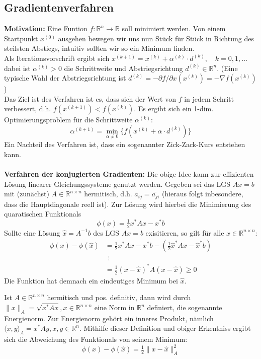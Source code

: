 \documentclass{article}
\begin{document}
\subsection{Gradientenverfahren}
\textbf{Motivation:} Eine Funtion $f:\mathbb{R}^n\rightarrow \mathbb{R}$ soll minimiert werden. 
Von einem Startpunkt $x^{(0)}$ ausgehen bewegen wir uns nun Stück für Stück in Richtung des steilsten Abstiegs, intuitiv sollten wir so ein Minimum finden. \\
Als Iterationsvorschrift ergibt sich $x^{(k+1)} = x^{(k)}+\alpha^{(k)}\cdot d^{(k)}, \quad k=0,1,\dotsc$\\
dabei ist $\alpha^{(k)}>0$ die Schrittweite und Abstriegsrichtung $d^{(k)}\in\mathbb{R}^n$.
(Eine typische Wahl der Abstriegsrichtung ist $d^{(k)}=-\partial f/\partial x (x^{(k)})=-\nabla f(x^{(k)})$) \\
Das Ziel ist des Verfahren ist es, dass sich der Wert von $f$ in jedem Schritt verbessert, d.h. $f(x^{(k+1)})<f(x^{(k)})$. 
Es ergibt sich ein 1-dim. Optimierungsproblem für die Schrittweite $\alpha^{(k)}$:
\[\alpha^{(k+1)}=\min_{\alpha\neq 0}\{f(x^{(k)}+\alpha\cdot d^{(k)})\}\]
Ein Nachteil des Verfahren ist, dass ein sogenannter \glqq Zick-Zack-Kurs\grqq{} entstehen kann. \\ \\
\textbf{Verfahren der konjugierten Gradienten:} Die obige Idee kann zur effizienten Lösung linearer Gleichungssysteme genutzt werden.
Gegeben sei das LGS $Ax=b$ mit (zunächst) $A\in\mathbb{R}^{n\times n}$ hermitisch, d.h. $a_{ij}=\overline{a_{ji}}$ (hieraus folgt inbesondere, dass die Hauptdiagonale reell ist). 
Zur Lösung wird hierbei die Minimierung des quaratischen Funktionals 
\[\phi(x)=\tfrac{1}{2}x^* Ax - x^*b\]
Sollte eine Lösung $\hat{x}=A^{-1}b$ des LGS $Ax=b$ exisitieren, so gilt für alle $x\in\mathbb{R}^{n\times n}$:
\begin{align*}
    \phi(x)-\phi(\hat{x}) &= \tfrac{1}{2}x^* Ax - x^*b - (\tfrac{1}{2}\hat{x}^* A\hat{x} - \hat{x}^*b) \\
    &\ \ \vdots \\
    &= \tfrac{1}{2} (x-\hat{x})^*A(x-\hat{x}) \geq 0
\end{align*}
Die Funktion hat demnach ein eindeutiges Minimum bei $\hat{x}$.
\begin{defbox}
    Ist $A\in\mathbb{R}^{n\times n}$ hermitisch und pos. definitiv, dann wird durch $\|x\|_A=\sqrt{x^*Ax}, x\in\mathbb{R}^{n\times n}$ eine Norm in $\mathbb{R}^n$ definiert, die sogenannte Energienorm. 
    Zur Energienorm gehört ein inneres Produkt, nämlich $\langle x,y\rangle_A=x^*Ay, x,y\in\mathbb{R}^n$.
    Mithilfe dieser Definition und obiger Erkentniss ergibt sich die Abweichung des Funktionals von seinem Minimum:
    \[\phi(x)-\phi(\hat{x}) = \tfrac{1}{2}\|x-\hat{x}\|^2_A\]
\end{defbox}
\end{document}
